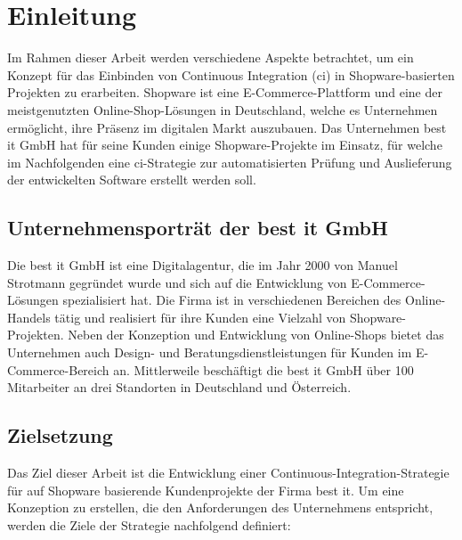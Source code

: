 
\section{Einleitung} \label{sec:01-introduction}

Im Rahmen dieser Arbeit werden verschiedene Aspekte betrachtet, um ein Konzept für das Einbinden von
Continuous Integration (\acrshort{ci}) in Shopware-basierten Projekten zu erarbeiten.
Shopware ist eine E-Commerce-Plattform und eine der meistgenutzten Online-Shop-Lösungen in
Deutschland, welche es Unternehmen ermöglicht, ihre Präsenz im digitalen Markt
auszubauen.
Das Unternehmen best it GmbH hat für seine Kunden einige Shopware-Projekte im Einsatz, für welche im Nachfolgenden
eine \acrshort{ci}-Strategie zur automatisierten Prüfung und Auslieferung der entwickelten Software erstellt werden
soll.

\subsection{Unternehmensporträt der best it GmbH} \label{subsec:01-introduction-1}

Die best it GmbH ist eine Digitalagentur, die im Jahr 2000 von Manuel Strotmann gegründet wurde und sich auf die
Entwicklung von E-Commerce-Lösungen spezialisiert hat.
Die Firma ist in verschiedenen Bereichen des Online-Handels tätig und realisiert für ihre Kunden eine Vielzahl von
Shopware-Projekten.
Neben der Konzeption und Entwicklung von Online-Shops bietet das Unternehmen auch Design- und
Beratungsdienstleistungen für Kunden im E-Commerce-Bereich an.
Mittlerweile beschäftigt die best it GmbH über 100 Mitarbeiter an drei Standorten in Deutschland und Österreich.

\subsection{Zielsetzung} \label{subsec:01-introduction-2}

Das Ziel dieser Arbeit ist die Entwicklung einer Continuous-Integration-Strategie für auf Shopware basierende
Kundenprojekte der Firma best it.
Um eine Konzeption zu erstellen, die den Anforderungen des Unternehmens entspricht, werden die Ziele der Strategie
nachfolgend definiert:


